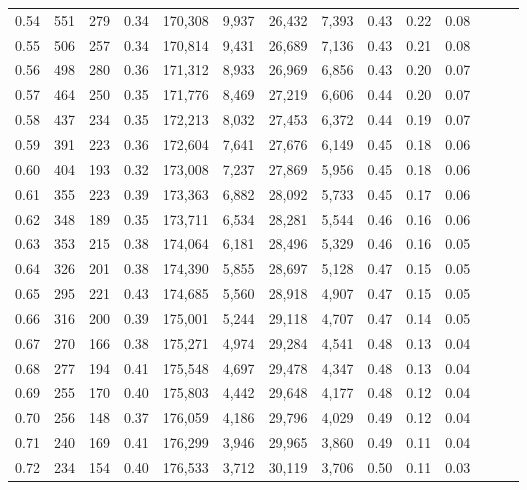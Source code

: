 \begin{tabular}{rrrrrrrrrrrrrr}
0.54 &    551 &  279 &  0.34 &  170,308 &    9,937 &  26,432 &   7,393 &  0.43 &  0.22 &      0.08 \\
0.55 &    506 &  257 &  0.34 &  170,814 &    9,431 &  26,689 &   7,136 &  0.43 &  0.21 &      0.08 \\
0.56 &    498 &  280 &  0.36 &  171,312 &    8,933 &  26,969 &   6,856 &  0.43 &  0.20 &      0.07 \\
0.57 &    464 &  250 &  0.35 &  171,776 &    8,469 &  27,219 &   6,606 &  0.44 &  0.20 &      0.07 \\
0.58 &    437 &  234 &  0.35 &  172,213 &    8,032 &  27,453 &   6,372 &  0.44 &  0.19 &      0.07 \\
0.59 &    391 &  223 &  0.36 &  172,604 &    7,641 &  27,676 &   6,149 &  0.45 &  0.18 &      0.06 \\
0.60 &    404 &  193 &  0.32 &  173,008 &    7,237 &  27,869 &   5,956 &  0.45 &  0.18 &      0.06 \\
0.61 &    355 &  223 &  0.39 &  173,363 &    6,882 &  28,092 &   5,733 &  0.45 &  0.17 &      0.06 \\
0.62 &    348 &  189 &  0.35 &  173,711 &    6,534 &  28,281 &   5,544 &  0.46 &  0.16 &      0.06 \\
0.63 &    353 &  215 &  0.38 &  174,064 &    6,181 &  28,496 &   5,329 &  0.46 &  0.16 &      0.05 \\
0.64 &    326 &  201 &  0.38 &  174,390 &    5,855 &  28,697 &   5,128 &  0.47 &  0.15 &      0.05 \\
0.65 &    295 &  221 &  0.43 &  174,685 &    5,560 &  28,918 &   4,907 &  0.47 &  0.15 &      0.05 \\
0.66 &    316 &  200 &  0.39 &  175,001 &    5,244 &  29,118 &   4,707 &  0.47 &  0.14 &      0.05 \\
0.67 &    270 &  166 &  0.38 &  175,271 &    4,974 &  29,284 &   4,541 &  0.48 &  0.13 &      0.04 \\
0.68 &    277 &  194 &  0.41 &  175,548 &    4,697 &  29,478 &   4,347 &  0.48 &  0.13 &      0.04 \\
0.69 &    255 &  170 &  0.40 &  175,803 &    4,442 &  29,648 &   4,177 &  0.48 &  0.12 &      0.04 \\
0.70 &    256 &  148 &  0.37 &  176,059 &    4,186 &  29,796 &   4,029 &  0.49 &  0.12 &      0.04 \\
0.71 &    240 &  169 &  0.41 &  176,299 &    3,946 &  29,965 &   3,860 &  0.49 &  0.11 &      0.04 \\
0.72 &    234 &  154 &  0.40 &  176,533 &    3,712 &  30,119 &   3,706 &  0.50 &  0.11 &      0.03 \\

\end{tabular}
